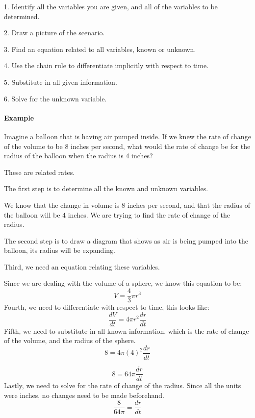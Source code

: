 1. Identify all the variables you are given, and all of the variables to be determined.

2. Draw a picture of the scenario.

3. Find an equation related to all variables, known or unknown.

4. Use the chain rule to differentiate implicitly with respect to time.

5. Substitute in all given information.

6. Solve for the unknown variable.



\paragraph{Example}



Imagine a balloon that is having air pumped inside. If we knew the rate of change of the volume to be 8 inches per second, what would the rate of change be for the radius of the balloon when the radius is 4 inches?



These are related rates.



The first step is to determine all the known and unknown variables.



We know that the change in volume is 8 inches per second, and that the radius of the balloon will be 4 inches. We are trying to find the rate of change of the radius.



The second step is to draw a diagram that shows as air is being pumped into the balloon, its radius will be expanding.



Third, we need an equation relating these variables.



Since we are dealing with the volume of a sphere, we know this equation to be:
$$
V = \frac{4}{3}\pi r^3
$$
Fourth, we need to differentiate with respect to time, this looks like:
$$
\frac{dV}{dt} = 4\pi r^2 \frac{dr}{dt}
$$
Fifth, we need to substitute in all known information, which is the rate of change of the volume, and the radius of the sphere.
$$
8 = 4\pi (4)^2 \frac{dr}{dt}
$$



$$
8 = 64\pi \frac{dr}{dt}
$$
Lastly, we need to solve for the rate of change of the radius. Since all the units were inches, no changes need to be made beforehand.
$$
\frac{8}{64\pi} = \frac{dr}{dt}
$$



